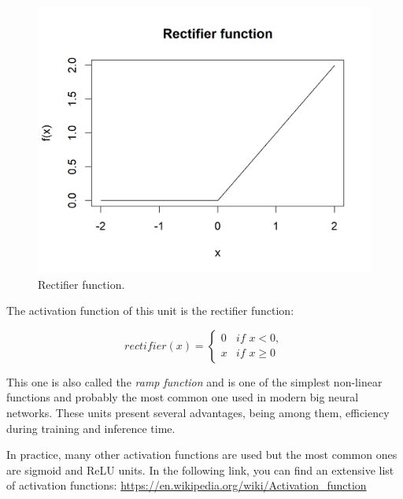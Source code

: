 \documentclass[
  11pt,
]{krantz}
\makeatletter
\newenvironment{kframe}{%
\medskip{}
\setlength{\fboxsep}{.8em}
 \def\at@end@of@kframe{}%
 \ifinner\ifhmode%
  \def\at@end@of@kframe{\end{minipage}}%
  \begin{minipage}{\columnwidth}%
 \fi\fi%
 \def\FrameCommand##1{\hskip\@totalleftmargin \hskip-\fboxsep
 \colorbox{shadecolor}{##1}\hskip-\fboxsep
     \hskip-\linewidth \hskip-\@totalleftmargin \hskip\columnwidth}%
 \MakeFramed {\advance\hsize-\width
   \@totalleftmargin\z@ \linewidth\hsize
   \@setminipage}}%
 {\par\unskip\endMakeFramed%
 \at@end@of@kframe}
\newenvironment{rmdblock}[1]
  {
  \begin{itemize}
  \renewcommand{\labelitemi}{
    \raisebox{-.7\height}[0pt][0pt]{
      {\setkeys{Gin}{width=3em,keepaspectratio}\texttt{[image: images/icons/\#1]}}
    }
  }
  \setlength{\fboxsep}{1em}
  \begin{kframe}
  \item
  }
  {
  \end{kframe}
  \end{itemize}
  }
\newenvironment{rmdinfo}
  {\begin{rmdblock}{info}}
  {\end{rmdblock}}
\makeatother
\begin{document}
\begin{figure}

{\centering \includegraphics[width=1\linewidth]{images/nn_relu} 

}

\caption{Rectifier function.}\label{fig:nnRectified}
\end{figure}

The activation function of this unit is the rectifier function:

\begin{equation}
  rectifier(x) =
 \begin{cases}
  0 & \textit{if } x < 0, \\
  x & \textit{if } x \geq 0
 \end{cases}
  \label{eq:rectifierfunct}
\end{equation}

This one is also called the \emph{ramp function} and is one of the simplest non-linear functions and probably the most common one used in modern big neural networks. These units present several advantages, being among them, efficiency during training and inference time.

\begin{rmdinfo}
In practice, many other activation functions are used but the most common ones are sigmoid and ReLU units. In the following link, you can find an extensive list of activation functions: \url{https://en.wikipedia.org/wiki/Activation_function}
\end{rmdinfo}
\end{document}
